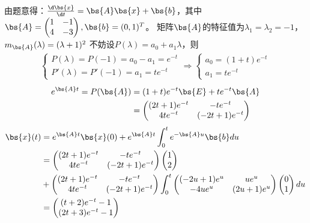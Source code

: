 \documentclass[12pt, a4paper, oneside, UTF8]{ctexbook}
\begin{document}
\begin{solution}
    由题意得：$\frac{\d \bs{x}}{\d t}=\bs{A}\bs{x}+\bs{b}$，其中$\bs{A}=\begin{pmatrix}
        1&-1\\
        4&-3
    \end{pmatrix},\bs{b}=(0,1)^T$。
    矩阵$\bs{A}$的特征值为$\lambda_1=\lambda_2=-1$，$m_{\bs{A}}(\lambda)=(\lambda+1)^2$
    不妨设$P(\lambda)=a_0+a_1\lambda$，则 \begin{align*}
        \left\{
            \begin{array}{ll}
                P(\lambda)=P(-1)=a_0-a_1=e^{-t}\\
                P'(\lambda)=P'(-1)=a_1=te^{-t}
            \end{array}
            \right.
        \Rightarrow
        \left\{
            \begin{array}{ll}
                a_0=(1+t)e^{-t}\\
                a_1=te^{-t}
            \end{array}
            \right.
    \end{align*}
    \begin{align*}
        e^{\bs{A}t}=P(\bs{A})
    &=(1+t)e^{-t}\bs{E}+te^{-t}\bs{A}\\
    &=\begin{pmatrix}
        (2t+1)e^{-t} &-te^{-t} \\
        4te^{-t}  & (-2t+1)e^{-t}
    \end{pmatrix}
    \end{align*}
    \begin{align*}
        \bs{x}(t)&=e^{\bs{A}t}\bs{x}(0)+e^{\bs{A}t}\int_{0}^t e^{-\bs{A}u}\bs{b} du\\
        &=\begin{pmatrix}
            (2t+1)e^{-t} &-te^{-t} \\
        4te^{-t}  & (-2t+1)e^{-t}
        \end{pmatrix}\begin{pmatrix}
            1 \\
            2
        \end{pmatrix}\\
        &+\begin{pmatrix}
            (2t+1)e^{-t} &-te^{-t} \\
        4te^{-t}  & (-2t+1)e^{-t}
        \end{pmatrix}\int_{0}^t 
        \begin{pmatrix}
            (-2u+1)e^{u} &ue^{u} \\
        -4ue^{u}  & (2u+1)e^{u}
        \end{pmatrix} \begin{pmatrix}
            0\\
            1
        \end{pmatrix} du \\
        &=\begin{pmatrix}
            (t+2)e^{-t}-1 \\
            (2t+3)e^{-t}-1
        \end{pmatrix}
        \end{align*}
\end{solution}
\end{document}
